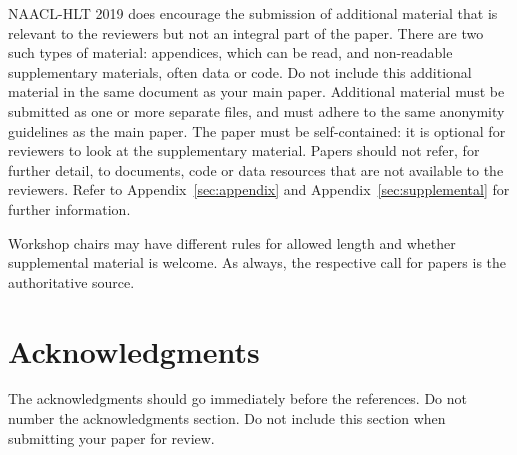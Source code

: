 \documentclass[11pt,a4paper]{article}
\begin{document}
NAACL-HLT 2019 does encourage the submission of additional material that is relevant to the reviewers but not an integral part of the paper. There are two such types of material: appendices, which can be read, and non-readable supplementary materials, often data or code.  Do not include this additional material in the same document as your main paper. Additional material must be submitted as one or more separate files, and must adhere to the same anonymity guidelines as the main paper. The paper must be self-contained: it is optional for reviewers to look at the supplementary material. Papers should not refer, for further detail, to documents, code or data resources that are not available to the reviewers. Refer to Appendix~\ref{sec:appendix} and Appendix~\ref{sec:supplemental} for further information. 

Workshop chairs may have different rules for allowed length and
whether supplemental material is welcome. As always, the respective
call for papers is the authoritative source.

\section{Acknowledgments}

The acknowledgments should go immediately before the references.  Do
not number the acknowledgments section. Do not include this section
when submitting your paper for review. \\

\fi



\end{document}
